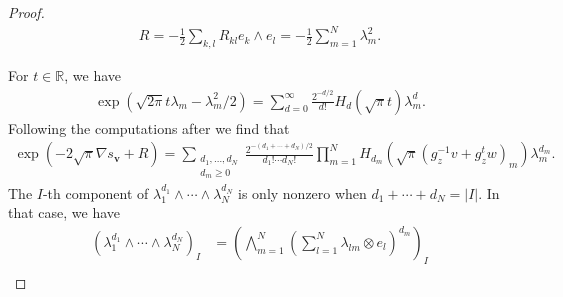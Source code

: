 \documentclass[a4paper,11pt]{amsart} %
\newcommand{\8}{\infty}
\newcommand{\vbf}{\mathbf{v}}
\newcommand{\R}{\mathbb{R}}
\theoremstyle{mytheoremstyle}
\theoremstyle{remark}
\numberwithin{equation}{section}
\begin{document}
\begin{proof}
\begin{align}
 R =-\frac{1}{2}\sum_{k,l} R_{kl} e_k \wedge e_l  = - \frac{1}{2} \sum_{m=1}^N \lambda_m^2.
\end{align}

For $t\in \R$, we have
\begin{align}
\exp(\sqrt{2\pi}t\lambda_m-\lambda_m^2/2)=\sum_{d=0}^\8 \frac{2^{-d/2}}{d!}H_d(\sqrt{\pi}t)\lambda_m^d.
\end{align}
Following the computations after \cite[Lemma.~4.4]{rbrkmmq} we find that
\begin{align} \label{equationforexp}
 \exp \left (-2\sqrt{\pi} \nabla s_\vbf+R \right ) = \sum_{\substack{d_1, \dots,d_N \\ d_m \geq0}}\frac{2^{-(d_1+\cdots+d_N)/2}}{d_1!\cdots d_N!}\prod_{m=1}^NH_{d_m}(\sqrt{\pi}(g_z^{-1}v+g_z^tw)_m) \lambda_m^{d_m}.
\end{align}
The $I$-th component of $\lambda_1^{d_1} \wedge \cdots \wedge \lambda_N^{d_N}$ is only nonzero when $d_1+ \cdots + d_N=\vert I \vert$. In that case, we have
\begin{align}
(\lambda_1^{d_1} \wedge \cdots \wedge \lambda_N^{d_N})_I & = \left (\bigwedge_{m=1}^N \left ( \sum_{l=1}^N \lambda_{lm} \otimes e_l \right )^{d_m} \right )_I \\

\end{align}
\end{proof}
\end{document}
